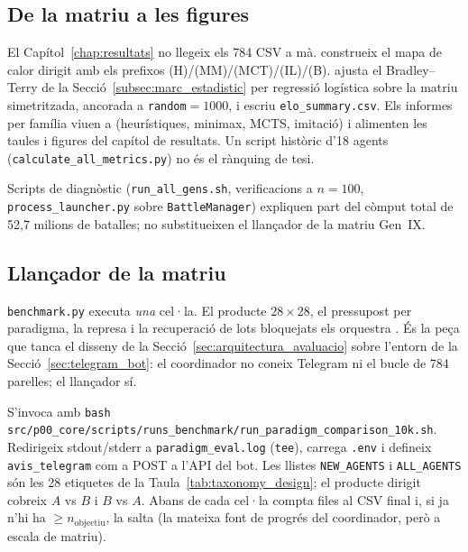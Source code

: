 \subsection{De la matriu a les figures}
\label{sec:reporting_impl}

El Capítol~\ref{chap:resultats} no llegeix els 784 CSV a mà.  construeix el mapa de calor dirigit amb els prefixos (H)/(MM)/(MCT)/(IL)/(B).  ajusta el Bradley--Terry de la Secció~\ref{subsec:marc_estadistic} per regressió logística sobre la matriu simetritzada, ancorada a \texttt{random}${}=1000$, i escriu \texttt{elo\_summary.csv}. Els informes per família viuen a  (heurístiques, minimax, MCTS, imitació) i alimenten les taules i figures del capítol de resultats. Un script històric d'18 agents (\texttt{calculate\_all\_metrics.py}) no és el rànquing de tesi.

Scripts de diagnòstic (\texttt{run\_all\_gens.sh}, verificacions a $n=100$, \texttt{process\_launcher.py} sobre \texttt{BattleManager}) expliquen part del còmput total de 52,7 milions de batalles; no substitueixen el llançador de la matriu Gen~IX.

\subsection{Llançador de la matriu}
\label{sec:matrix_launcher}

\texttt{benchmark.py} executa \emph{una} cel·la. El producte $28\times 28$, el pressupost per paradigma, la represa i la recuperació de lots bloquejats els orquestra . És la peça que tanca el disseny de la Secció~\ref{sec:arquitectura_avaluacio} sobre l'entorn de la Secció~\ref{sec:telegram_bot}: el coordinador no coneix Telegram ni el bucle de 784 parelles; el llançador sí.

S'invoca amb \texttt{bash src/p00\_core/scripts/runs\_benchmark/run\_paradigm\_comparison\_10k.sh}. Redirigeix stdout/stderr a \texttt{paradigm\_eval.log} (\texttt{tee}), carrega \texttt{.env} i defineix \texttt{avis\_telegram} com a POST a l'API del bot. Les llistes \texttt{NEW\_AGENTS} i \texttt{ALL\_AGENTS} són les 28 etiquetes de la Taula~\ref{tab:taxonomy_design}; el producte dirigit cobreix $A$ vs $B$ i $B$ vs $A$. Abans de cada cel·la compta files al CSV final i, si ja n'hi ha $\ge n_{\mathrm{objectiu}}$, la salta (la mateixa font de progrés del coordinador, però a escala de matriu).

